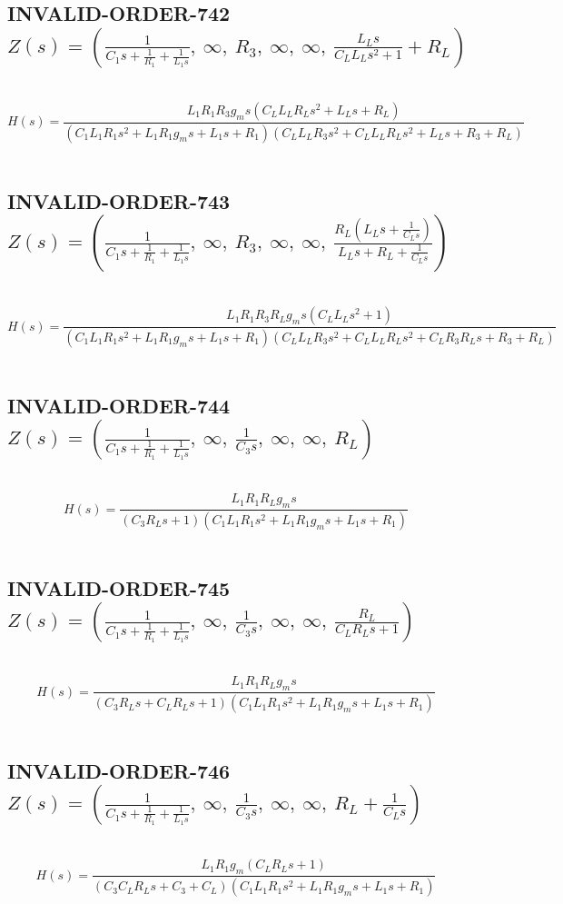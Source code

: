 \documentclass{article}
\begin{document}
\subsection{INVALID-ORDER-742 $Z(s) = \left( \frac{1}{C_{1} s + \frac{1}{R_{1}} + \frac{1}{L_{1} s}}, \  \infty, \  R_{3}, \  \infty, \  \infty, \  \frac{L_{L} s}{C_{L} L_{L} s^{2} + 1} + R_{L}\right)$ } \ 
\textbf{\[H(s) = \frac{L_{1} R_{1} R_{3} g_{m} s \left(C_{L} L_{L} R_{L} s^{2} + L_{L} s + R_{L}\right)}{\left(C_{1} L_{1} R_{1} s^{2} + L_{1} R_{1} g_{m} s + L_{1} s + R_{1}\right) \left(C_{L} L_{L} R_{3} s^{2} + C_{L} L_{L} R_{L} s^{2} + L_{L} s + R_{3} + R_{L}\right)}\] } \ 
\subsection{INVALID-ORDER-743 $Z(s) = \left( \frac{1}{C_{1} s + \frac{1}{R_{1}} + \frac{1}{L_{1} s}}, \  \infty, \  R_{3}, \  \infty, \  \infty, \  \frac{R_{L} \left(L_{L} s + \frac{1}{C_{L} s}\right)}{L_{L} s + R_{L} + \frac{1}{C_{L} s}}\right)$ } \ 
\textbf{\[H(s) = \frac{L_{1} R_{1} R_{3} R_{L} g_{m} s \left(C_{L} L_{L} s^{2} + 1\right)}{\left(C_{1} L_{1} R_{1} s^{2} + L_{1} R_{1} g_{m} s + L_{1} s + R_{1}\right) \left(C_{L} L_{L} R_{3} s^{2} + C_{L} L_{L} R_{L} s^{2} + C_{L} R_{3} R_{L} s + R_{3} + R_{L}\right)}\] } \ 
\subsection{INVALID-ORDER-744 $Z(s) = \left( \frac{1}{C_{1} s + \frac{1}{R_{1}} + \frac{1}{L_{1} s}}, \  \infty, \  \frac{1}{C_{3} s}, \  \infty, \  \infty, \  R_{L}\right)$ } \ 
\textbf{\[H(s) = \frac{L_{1} R_{1} R_{L} g_{m} s}{\left(C_{3} R_{L} s + 1\right) \left(C_{1} L_{1} R_{1} s^{2} + L_{1} R_{1} g_{m} s + L_{1} s + R_{1}\right)}\] } \ 
\subsection{INVALID-ORDER-745 $Z(s) = \left( \frac{1}{C_{1} s + \frac{1}{R_{1}} + \frac{1}{L_{1} s}}, \  \infty, \  \frac{1}{C_{3} s}, \  \infty, \  \infty, \  \frac{R_{L}}{C_{L} R_{L} s + 1}\right)$ } \ 
\textbf{\[H(s) = \frac{L_{1} R_{1} R_{L} g_{m} s}{\left(C_{3} R_{L} s + C_{L} R_{L} s + 1\right) \left(C_{1} L_{1} R_{1} s^{2} + L_{1} R_{1} g_{m} s + L_{1} s + R_{1}\right)}\] } \ 
\subsection{INVALID-ORDER-746 $Z(s) = \left( \frac{1}{C_{1} s + \frac{1}{R_{1}} + \frac{1}{L_{1} s}}, \  \infty, \  \frac{1}{C_{3} s}, \  \infty, \  \infty, \  R_{L} + \frac{1}{C_{L} s}\right)$ } \ 
\textbf{\[H(s) = \frac{L_{1} R_{1} g_{m} \left(C_{L} R_{L} s + 1\right)}{\left(C_{3} C_{L} R_{L} s + C_{3} + C_{L}\right) \left(C_{1} L_{1} R_{1} s^{2} + L_{1} R_{1} g_{m} s + L_{1} s + R_{1}\right)}\] } \ 
\end{document}
